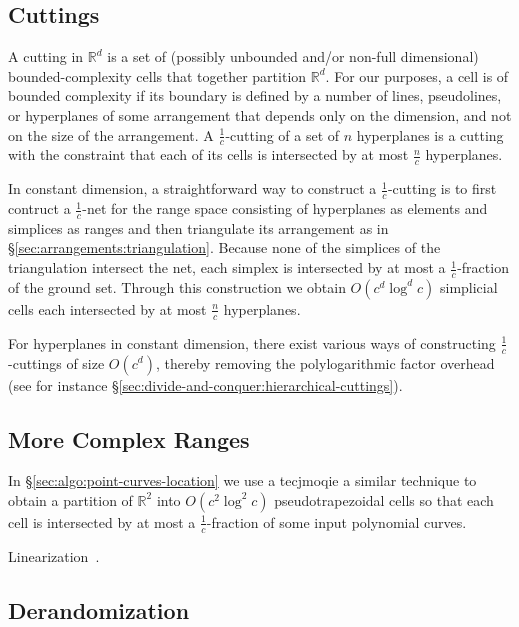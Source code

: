 \subsection{Cuttings}%
\label{sec:divide-and-conquer:cuttings}

A cutting in \(\mathbb{R}^d\)
is a set of (possibly unbounded and/or non-full dimensional)
bounded-complexity cells that together partition \(\mathbb{R}^{d}\).
%
For our purposes, a cell is of bounded complexity if its boundary is defined by
a number of lines, pseudolines, or hyperplanes of some arrangement
that depends only on the dimension, and not on the size of the arrangement.
%
A \(\frac{1}{c}\)-cutting of a set of \(n\) hyperplanes is a cutting with the
constraint that each of its cells is intersected by at most \(\frac{n}{c}\)
hyperplanes.

In constant dimension,
a straightforward way to construct a \(\frac 1c\)-cutting is to first contruct
a \(\frac 1c\)-net for the range space consisting of hyperplanes as elements
and simplices as ranges and then triangulate its arrangement as in
\S\ref{sec:arrangements:triangulation}. Because none of the simplices of the
triangulation intersect the net, each simplex is intersected by at most a
\(\frac 1c\)-fraction of the ground set.
%
Through this construction we obtain \(O(c^d \log^d c)\) simplicial cells each
intersected by at most \(\frac{n}{c}\) hyperplanes.

For hyperplanes in constant dimension,
there exist various ways of constructing \(\frac{1}{c}\)-cuttings of size
\(O(c^d)\), thereby removing the polylogarithmic factor overhead (see for
instance \S\ref{sec:divide-and-conquer:hierarchical-cuttings}).

\subsection{More Complex Ranges}

In \S\ref{sec:algo:point-curves-location} we use a tecjmoqie
a similar technique to obtain
a partition of \(\mathbb{R}^2\) into \(O(c^2 \log^2 c)\) pseudotrapezoidal
cells so that each cell is intersected by at most a \(\frac 1c\)-fraction of
some input polynomial curves.


Linearization~\cite{YY85,AM94}.



\subsection{Derandomization}

